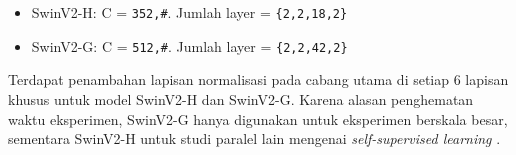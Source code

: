 \begin{itemize}[nolistsep]

  \item SwinV2-H: C = \verb|352,#|. Jumlah layer = \verb|{2,2,18,2}|

  \item SwinV2-G: C = \verb|512,#|. Jumlah layer = \verb|{2,2,42,2}|

\end{itemize}

Terdapat penambahan lapisan normalisasi pada cabang utama di setiap 6 lapisan khusus untuk model SwinV2-H dan SwinV2-G. Karena alasan penghematan waktu eksperimen, \linebreak SwinV2-G hanya digunakan untuk eksperimen 
berskala besar, sementara SwinV2-H untuk studi paralel lain mengenai \emph{self-supervised learning} \parencite{Liuv22021}.






